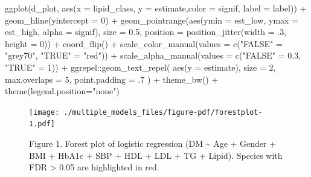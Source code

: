 \documentclass[
  letterpaper,
  DIV=11,
  numbers=noendperiod]{scrreprt}
\newenvironment{Shaded}{\begin{snugshade}}{\end{snugshade}}
\newcommand{\AttributeTok}[1]{\textcolor[rgb]{0.40,0.45,0.13}{#1}}
\newcommand{\DecValTok}[1]{\textcolor[rgb]{0.68,0.00,0.00}{#1}}
\newcommand{\FloatTok}[1]{\textcolor[rgb]{0.68,0.00,0.00}{#1}}
\newcommand{\FunctionTok}[1]{\textcolor[rgb]{0.28,0.35,0.67}{#1}}
\newcommand{\NormalTok}[1]{\textcolor[rgb]{0.00,0.23,0.31}{#1}}
\newcommand{\OtherTok}[1]{\textcolor[rgb]{0.00,0.23,0.31}{#1}}
\newcommand{\SpecialCharTok}[1]{\textcolor[rgb]{0.37,0.37,0.37}{#1}}
\newcommand{\StringTok}[1]{\textcolor[rgb]{0.13,0.47,0.30}{#1}}
\begin{document}
\begin{Shaded}
\begin{Highlighting}[]
\FunctionTok{ggplot}\NormalTok{(d\_plot, }\FunctionTok{aes}\NormalTok{(}\AttributeTok{x =}\NormalTok{ lipid\_class, }\AttributeTok{y =}\NormalTok{ estimate,}\AttributeTok{color =}\NormalTok{ signif, }\AttributeTok{label =}\NormalTok{ label)) }\SpecialCharTok{+}
  \FunctionTok{geom\_hline}\NormalTok{(}\AttributeTok{yintercept =} \DecValTok{0}\NormalTok{) }\SpecialCharTok{+}
  \FunctionTok{geom\_pointrange}\NormalTok{(}\FunctionTok{aes}\NormalTok{(}\AttributeTok{ymin =}\NormalTok{ est\_low, }\AttributeTok{ymax =}\NormalTok{ est\_high, }\AttributeTok{alpha =}\NormalTok{ signif),}
                  \AttributeTok{size =} \FloatTok{0.5}\NormalTok{,}
                  \AttributeTok{position =} \FunctionTok{position\_jitter}\NormalTok{(}\AttributeTok{width =}\NormalTok{ .}\DecValTok{3}\NormalTok{, }\AttributeTok{height =} \DecValTok{0}\NormalTok{)) }\SpecialCharTok{+}
  \FunctionTok{coord\_flip}\NormalTok{() }\SpecialCharTok{+}
  \FunctionTok{scale\_color\_manual}\NormalTok{(}\AttributeTok{values =} \FunctionTok{c}\NormalTok{(}\StringTok{"FALSE"} \OtherTok{=} \StringTok{"grey70"}\NormalTok{, }\StringTok{"TRUE"} \OtherTok{=} \StringTok{"red"}\NormalTok{)) }\SpecialCharTok{+}
  \FunctionTok{scale\_alpha\_manual}\NormalTok{(}\AttributeTok{values =} \FunctionTok{c}\NormalTok{(}\StringTok{"FALSE"} \OtherTok{=} \FloatTok{0.3}\NormalTok{, }\StringTok{"TRUE"} \OtherTok{=} \DecValTok{1}\NormalTok{)) }\SpecialCharTok{+}
\NormalTok{  ggrepel}\SpecialCharTok{::}\FunctionTok{geom\_text\_repel}\NormalTok{(}
    \FunctionTok{aes}\NormalTok{(}\AttributeTok{y =}\NormalTok{ estimate),}
    \AttributeTok{size =} \DecValTok{2}\NormalTok{,}
    \AttributeTok{max.overlaps =} \DecValTok{5}\NormalTok{,}
    \AttributeTok{point.padding =}\NormalTok{ .}\DecValTok{7}
\NormalTok{  ) }\SpecialCharTok{+}
  \FunctionTok{theme\_bw}\NormalTok{() }\SpecialCharTok{+} 
  \FunctionTok{theme}\NormalTok{(}\AttributeTok{legend.position=}\StringTok{"none"}\NormalTok{)}
\end{Highlighting}
\end{Shaded}

\begin{figure}[H]

{\centering \texttt{[image: ./multiple\_models\_files/figure-pdf/forestplot-1.pdf]}

}

\caption{Figure 1. Forest plot of logistic regression (DM
\textasciitilde{} Age + Gender + BMI + HbA1c + SBP + HDL + LDL + TG +
Lipid). Species with FDR \textgreater{} 0.05 are highlighted in red.}

\end{figure}
\end{document}
